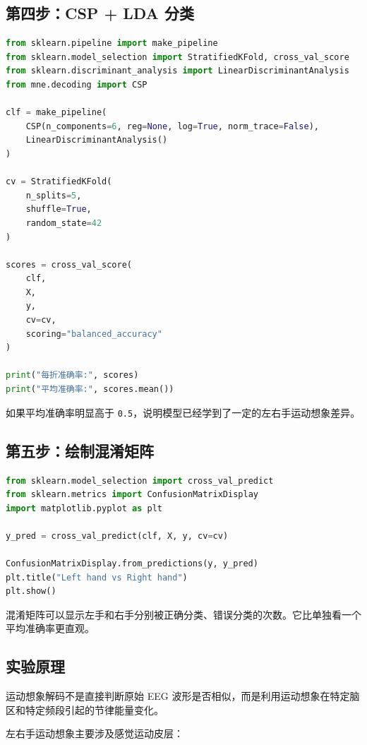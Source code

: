 \documentclass[UTF8,a4paper,12pt]{ctexart}
\begin{document}
\subsection{第四步：CSP + LDA 分类}

\begin{lstlisting}[language=Python,caption={CSP + LDA 交叉验证分类}]
from sklearn.pipeline import make_pipeline
from sklearn.model_selection import StratifiedKFold, cross_val_score
from sklearn.discriminant_analysis import LinearDiscriminantAnalysis
from mne.decoding import CSP

clf = make_pipeline(
    CSP(n_components=6, reg=None, log=True, norm_trace=False),
    LinearDiscriminantAnalysis()
)

cv = StratifiedKFold(
    n_splits=5,
    shuffle=True,
    random_state=42
)

scores = cross_val_score(
    clf,
    X,
    y,
    cv=cv,
    scoring="balanced_accuracy"
)

print("每折准确率:", scores)
print("平均准确率:", scores.mean())
\end{lstlisting}

如果平均准确率明显高于 \texttt{0.5}，说明模型已经学到了一定的左右手运动想象差异。

\subsection{第五步：绘制混淆矩阵}

\begin{lstlisting}[language=Python,caption={绘制混淆矩阵}]
from sklearn.model_selection import cross_val_predict
from sklearn.metrics import ConfusionMatrixDisplay
import matplotlib.pyplot as plt

y_pred = cross_val_predict(clf, X, y, cv=cv)

ConfusionMatrixDisplay.from_predictions(y, y_pred)
plt.title("Left hand vs Right hand")
plt.show()
\end{lstlisting}

混淆矩阵可以显示左手和右手分别被正确分类、错误分类的次数。它比单独看一个平均准确率更直观。

\subsection{实验原理}

运动想象解码不是直接判断原始 EEG 波形是否相似，而是利用运动想象在特定脑区和特定频段引起的节律能量变化。

左右手运动想象主要涉及感觉运动皮层：
\end{document}
